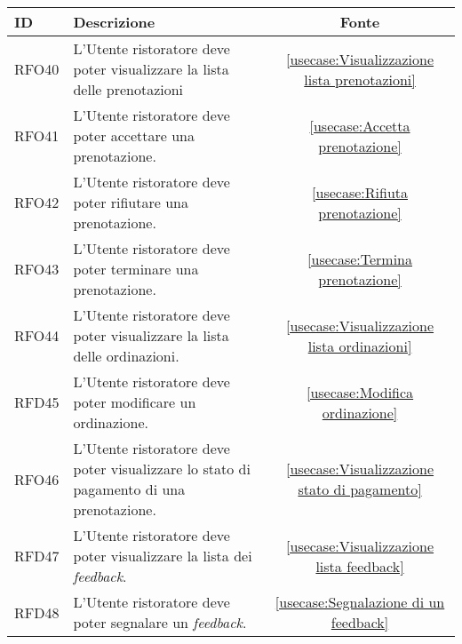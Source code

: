\begin{table}[H]
	\renewcommand{\arraystretch}{1.5}
	\centering
	\begin{tabularx}{\textwidth}{l|X|c}
		\textbf{ID} & \textbf{Descrizione}                                                                                                    & \textbf{Fonte}                                                       \\
		\hline
		RFO40       & L'Utente ristoratore deve poter visualizzare la lista delle prenotazioni												  & \autoref{usecase:Visualizzazione lista prenotazioni}                 \\
		\hline
		RFO41       & L'Utente ristoratore deve poter accettare una prenotazione.                                                             & \autoref{usecase:Accetta prenotazione}                               \\
		\hline
		RFO42       & L'Utente ristoratore deve poter rifiutare una prenotazione.                                                             & \autoref{usecase:Rifiuta prenotazione}                               \\
		\hline
		RFO43       & L'Utente ristoratore deve poter terminare una prenotazione.                                                             & \autoref{usecase:Termina prenotazione}                               \\
		\hline
		RFO44       & L'Utente ristoratore deve poter visualizzare la lista delle ordinazioni.                                                & \autoref{usecase:Visualizzazione lista ordinazioni}                  \\
		\hline
		RFD45       & L'Utente ristoratore deve poter modificare un ordinazione.                                                              & \autoref{usecase:Modifica ordinazione}                               \\
		\hline
		RFO46       & L'Utente ristoratore deve poter visualizzare lo stato di pagamento di una prenotazione.                                 & \autoref{usecase:Visualizzazione stato di pagamento}                 \\
		\hline
		RFD47       & L'Utente ristoratore deve poter visualizzare la lista dei \textit{feedback}.                                            & \autoref{usecase:Visualizzazione lista feedback}                     \\
		\hline
		RFD48       & L'Utente ristoratore deve poter segnalare un \textit{feedback}.                                                         & \autoref{usecase:Segnalazione di un feedback}                        \\

\end{tabularx}
\end{table}
